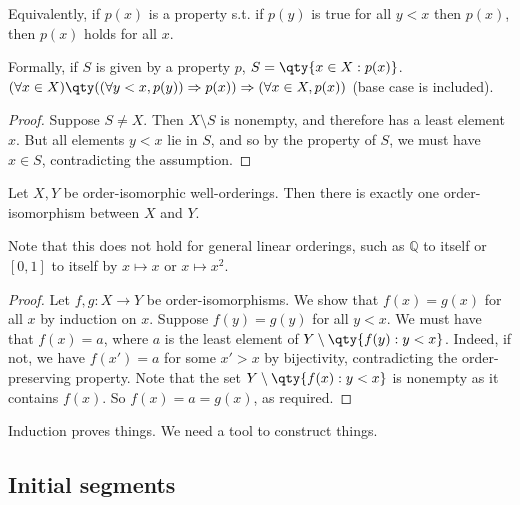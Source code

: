 \begin{remark}
    Equivalently, if $p(x)$ is a property s.t. if $p(y)$ is true for all $y < x$ then $p(x)$, then $p(x)$ holds for all $x$.

    Formally, if $S$ is given by a property $p$, $S = \qty{x \in X : p(x)}$. \\
    $(\forall x \in X)\qty((\forall y < x, p(y)) \implies p(x)) \implies (\forall x \in X, p(x))$ (base case is included).
\end{remark}

\begin{proof}
    Suppose $S \neq X$.
    Then $X \setminus S$ is nonempty, and therefore has a least element $x$.
    But all elements $y < x$ lie in $S$, and so by the property of $S$, we must have $x \in S$, contradicting the assumption.
\end{proof}

\begin{proposition}
    Let $X, Y$ be order-isomorphic well-orderings.
    Then there is exactly one order-isomorphism between $X$ and $Y$.
\end{proposition}

Note that this does not hold for general linear orderings, such as $\mathbb Q$ to itself or $[0,1]$ to itself by $x \mapsto x$ or $x \mapsto x^2$.

\begin{proof}
    Let $f, g \colon X \to Y$ be order-isomorphisms.
    We show that $f(x) = g(x)$ for all $x$ by induction on $x$.
    Suppose $f(y) = g(y)$ for all $y < x$.
    We must have that $f(x) = a$, where $a$ is the least element of $Y \setminus \qty{f(y) : y < x}$.
    Indeed, if not, we have $f(x') = a$ for some $x' > x$ by bijectivity, contradicting the order-preserving property.
    Note that the set $Y \setminus \qty{f(x) : y < x}$ is nonempty as it contains $f(x)$.
    So $f(x) = a = g(x)$, as required.
\end{proof}

\begin{remark}
    Induction proves things.
    We need a tool to construct things.
\end{remark}

\subsection{Initial segments}

